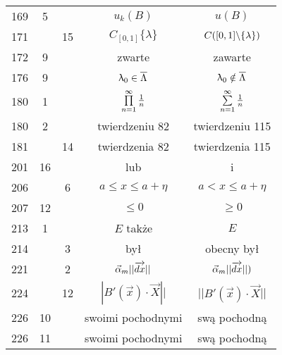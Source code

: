 \documentclass[a4paper,11pt]{article}
\begin{document}
\begin{center}
\begin{tabular}{|c|c|c|c|c|}
    169 &  5 & & $u_{ k }( B )$ & $u( B )$ \\
    171 & & 15 & $C_{ [ 0, 1 ] } \{ \lambda \}$
           & $C( [ 0, 1 ] \backslash \{ \lambda \} )$ \\
    172 &  9 & & zwarte & zawarte \\
    176 &  9 & & $\uplambda_{ 0 } \in \overline{ \Lambda }$
           & $\uplambda_{ 0 } \notin \overline{ \Lambda }$ \\
    180 &  1 & & $\prod\limits^{ \infty }_{ n = 1 } \frac{ 1 }{ n }$
           & $\sum\limits^{ \infty }_{ n = 1 } \frac{ 1 }{ n }$ \\
    180 &  2 & & twierdzeniu 82 & twierdzeniu 115 \\
    181 & & 14 & twierdzenia 82 & twierdzenia 115 \\
    201 & 16 & & lub & i \\
    206 & &  6 & $a \leq x \leq a + \eta$ & $a < x \leq a + \eta$ \\
    207 & 12 & & $\leq 0$ & $\geq 0$ \\
    213 &  1 & & $E$ także & $E$ \\
    214 & &  3 & był & obecny był \\
    221 & &  2 & $\vec{ \alpha }_{ m } || \overrightarrow{ dx } ||$
           & $\vec{ \alpha }_{ m } || \overrightarrow{ dx } || )$ \\
    224 & & 12 & $| B'( \vec{ x } ) \cdot \vec{ X } ||$
           & $|| B'( \vec{ x } ) \cdot \vec{ X } ||$ \\
    226 & 10 & & swoimi pochodnymi & swą pochodną \\
    226 & 11 & & swoimi pochodnymi & swą pochodną \\
    \hline
  \end{tabular}


\end{center}
\end{document}
